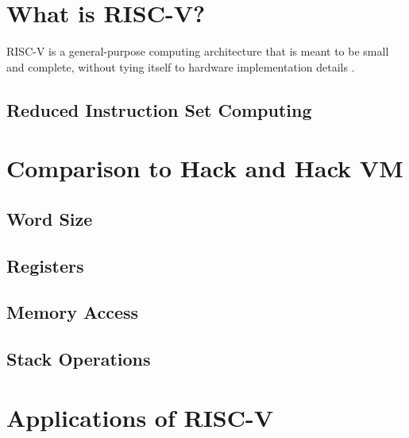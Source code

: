 \maketitle

\section{What is RISC-V?}

RISC-V is a general-purpose computing architecture that is meant to be small and
complete, without tying itself to hardware implementation details
\cite{waterman2019risc}.

\subsection{Reduced Instruction Set Computing}

\section{Comparison to Hack and Hack VM}

\subsection{Word Size}

\subsection{Registers}

\subsection{Memory Access}

\subsection{Stack Operations}

\section{Applications of RISC-V}
